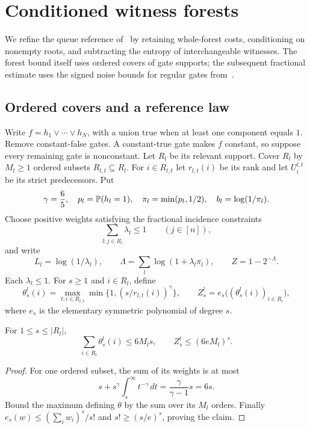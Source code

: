 \section{Conditioned witness forests}\label{sec:forests}

We refine the queue reference of~\cite{Threshold} by retaining whole-forest costs, conditioning on nonempty roots, and subtracting the entropy of interchangeable witnesses. The forest bound itself uses ordered covers of gate supports; the subsequent fractional estimate uses the signed noise bounds for regular gates from~\cite{Threshold}.

\subsection{Ordered covers and a reference law}

Write $f=h_1\vee\cdots\vee h_N$, with a union true when at least one component equals $1$. Remove constant-false gates. A constant-true gate makes $f$ constant, so suppose every remaining gate is nonconstant. Let $R_l$ be its relevant support. Cover $R_l$ by $M_l\ge1$ ordered subsets $R_{l,t}\subseteq R_l$. For $i\in R_{l,t}$ let $r_{l,t}(i)$ be its rank and let $U_i^{l,t}$ be its strict predecessors. Put
\[
 \gamma=\frac65,\quad p_l=\P(h_l=1),\quad
 \pi_l=\min(p_l,1/2),\quad b_l=\log(1/\pi_l).
\]
Choose positive weights satisfying the fractional incidence constraints
\begin{equation}\label{eq:forestpacking}
 \sum_{l:j\in R_l}\lambda_l\le1\qquad(j\in[n]),
\end{equation}
and write
\begin{equation}\label{eq:forestrootconstants}
 L_l=\log(1/\lambda_l),\qquad
 \Lambda=\sum_l\log(1+\lambda_l\pi_l),\qquad
 Z=1-2^{-\Lambda}.
\end{equation}
Each $\lambda_l\le1$. For $s\ge1$ and $i\in R_l$, define
\[
 \theta_s^l(i)=\max_{t:i\in R_{l,t}}
       \min\{1,(s/r_{l,t}(i))^\gamma\},\qquad
 Z_s^l=e_s\bigl((\theta_s^l(i))_{i\in R_l}\bigr),
\]
where $e_s$ is the elementary symmetric polynomial of degree $s$.

\begin{lemma}\label{lem:forestnormalizer}
For $1\le s\le|R_l|$,
\[
 \sum_{i\in R_l}\theta_s^l(i)\le6M_ls,
 \qquad Z_s^l\le(6eM_l)^s.
\]
\end{lemma}
\begin{proof}
For one ordered subset, the sum of its weights is at most
\[
 s+s^\gamma\int_s^\infty t^{-\gamma}\,dt
 =\frac{\gamma}{\gamma-1}s=6s.
\]
Bound the maximum defining $\theta$ by the sum over its $M_l$ orders. Finally $e_s(w)\le(\sum_iw_i)^s/s!$ and $s!\ge(s/e)^s$, proving the claim.
\end{proof}

